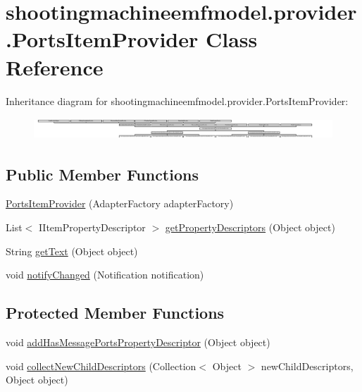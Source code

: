 \hypertarget{classshootingmachineemfmodel_1_1provider_1_1_ports_item_provider}{\section{shootingmachineemfmodel.\-provider.\-Ports\-Item\-Provider Class Reference}
\label{classshootingmachineemfmodel_1_1provider_1_1_ports_item_provider}
}
Inheritance diagram for shootingmachineemfmodel.\-provider.\-Ports\-Item\-Provider\-:\begin{figure}[H]
\begin{center}
\leavevmode
\includegraphics[height=0.831848cm]{classshootingmachineemfmodel_1_1provider_1_1_ports_item_provider}
\end{center}
\end{figure}
\subsection*{Public Member Functions}
\begin{DoxyCompactItemize}
\item 
\hyperlink{classshootingmachineemfmodel_1_1provider_1_1_ports_item_provider_a9ba52b9645d3ee7c55407fc1ab721385}{Ports\-Item\-Provider} (Adapter\-Factory adapter\-Factory)
\item 
List$<$ I\-Item\-Property\-Descriptor $>$ \hyperlink{classshootingmachineemfmodel_1_1provider_1_1_ports_item_provider_a98ed9faf171ba2a4090872977f234f15}{get\-Property\-Descriptors} (Object object)
\item 
String \hyperlink{classshootingmachineemfmodel_1_1provider_1_1_ports_item_provider_ae168e1ec84c88d7da3e1c5c340c91acb}{get\-Text} (Object object)
\item 
void \hyperlink{classshootingmachineemfmodel_1_1provider_1_1_ports_item_provider_a823bb4d9beb5ce771ebc1729ebfd44c0}{notify\-Changed} (Notification notification)
\end{DoxyCompactItemize}
\subsection*{Protected Member Functions}
\begin{DoxyCompactItemize}
\item 
void \hyperlink{classshootingmachineemfmodel_1_1provider_1_1_ports_item_provider_acba64f9c4f8e65d536301b265ca59c7a}{add\-Has\-Message\-Ports\-Property\-Descriptor} (Object object)
\item 
void \hyperlink{classshootingmachineemfmodel_1_1provider_1_1_ports_item_provider_ae49b7bfcd05db0887bb5c3e25e10704c}{collect\-New\-Child\-Descriptors} (Collection$<$ Object $>$ new\-Child\-Descriptors, Object object)
\end{DoxyCompactItemize}


